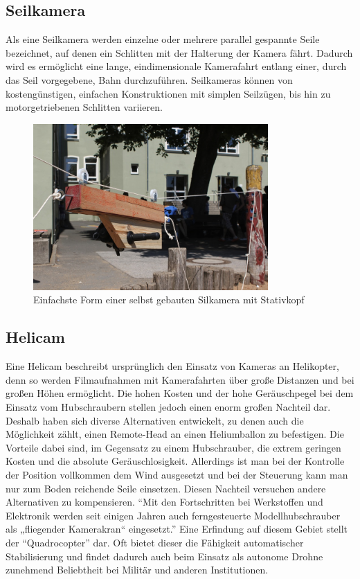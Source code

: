 \documentclass[a4paper, 12pt, bibtotocnumbered, liststotocnumbered]{scrartcl}
\begin{document}
	\subsection{Seilkamera}
	Als eine Seilkamera werden einzelne oder mehrere parallel gespannte Seile bezeichnet, auf denen ein Schlitten mit der Halterung der Kamera fährt. Dadurch wird es ermöglicht eine lange, eindimensionale Kamerafahrt entlang einer, durch das Seil vorgegebene, Bahn durchzuführen. Seilkameras können von kostengünstigen, einfachen Konstruktionen mit simplen Seilzügen, bis hin zu motorgetriebenen Schlitten variieren.

	\begin{figure}[htb]
		\centering
		\includegraphics[width=0.8\textwidth]{Bilder/Seilkamera}
		\caption{Einfachste Form einer selbst gebauten Silkamera mit Stativkopf}
	\end{figure}

	\subsection{Helicam}
	Eine Helicam beschreibt ursprünglich den Einsatz von Kameras an Helikopter, denn so werden Filmaufnahmen mit Kamerafahrten über große Distanzen und bei großen Höhen ermöglicht. Die hohen Kosten und der hohe Geräuschpegel bei dem Einsatz vom Hubschraubern stellen jedoch einen enorm großen Nachteil dar. Deshalb haben sich diverse Alternativen entwickelt, zu denen auch die Möglichkeit zählt, einen Remote-Head an einen Heliumballon zu befestigen. Die Vorteile dabei sind, im Gegensatz zu einem Hubschrauber, die extrem geringen Kosten und die absolute Geräuschlosigkeit. Allerdings ist man bei der Kontrolle der Position vollkommen dem Wind ausgesetzt und bei der Steuerung kann man nur zum Boden reichende Seile einsetzen. Diesen Nachteil versuchen andere Alternativen zu kompensieren. “Mit den Fortschritten bei Werkstoffen und Elektronik werden seit einigen Jahren auch ferngesteuerte Modellhubschrauber als „fliegender Kamerakran“ eingesetzt.” Eine Erfindung auf diesem Gebiet stellt der “Quadrocopter” dar. Oft bietet dieser die Fähigkeit automatischer Stabilisierung und findet dadurch auch beim Einsatz als autonome Drohne zunehmend Beliebtheit bei Militär und anderen Institutionen.
\end{document}
